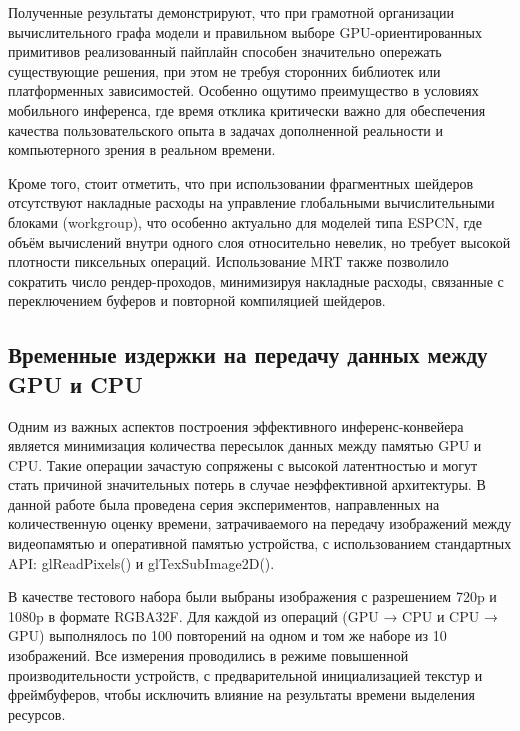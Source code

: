 \documentclass[a4paper,14pt]{extreport}
\begin{document}
            Полученные результаты демонстрируют, что при грамотной организации вычислительного графа модели и правильном выборе GPU-ориентированных примитивов реализованный пайплайн способен значительно опережать существующие решения, при этом не требуя сторонних библиотек или платформенных зависимостей. Особенно ощутимо преимущество в условиях мобильного инференса, где время отклика критически важно для обеспечения качества пользовательского опыта в задачах дополненной реальности и компьютерного зрения в реальном времени.
            
            Кроме того, стоит отметить, что при использовании фрагментных шейдеров отсутствуют накладные расходы на управление глобальными вычислительными блоками (workgroup), что особенно актуально для моделей типа ESPCN, где объём вычислений внутри одного слоя относительно невелик, но требует высокой плотности пиксельных операций. Использование MRT также позволило сократить число рендер-проходов, минимизируя накладные расходы, связанные с переключением буферов и повторной компиляцией шейдеров.

            \subsection{Временные издержки на передачу данных между GPU и CPU}
            Одним из важных аспектов построения эффективного инференс-конвейера является минимизация количества пересылок данных между памятью GPU и CPU. Такие операции зачастую сопряжены с высокой латентностью и могут стать причиной значительных потерь в случае неэффективной архитектуры. В данной работе была проведена серия экспериментов, направленных на количественную оценку времени, затрачиваемого на передачу изображений между видеопамятью и оперативной памятью устройства, с использованием стандартных API: glReadPixels() и glTexSubImage2D().

            В качестве тестового набора были выбраны изображения с разрешением 720p и 1080p в формате RGBA32F. Для каждой из операций (GPU → CPU и CPU → GPU) выполнялось по 100 повторений на одном и том же наборе из 10 изображений. Все измерения проводились в режиме повышенной производительности устройств, с предварительной инициализацией текстур и фреймбуферов, чтобы исключить влияние на результаты времени выделения ресурсов.
            
\end{document}
